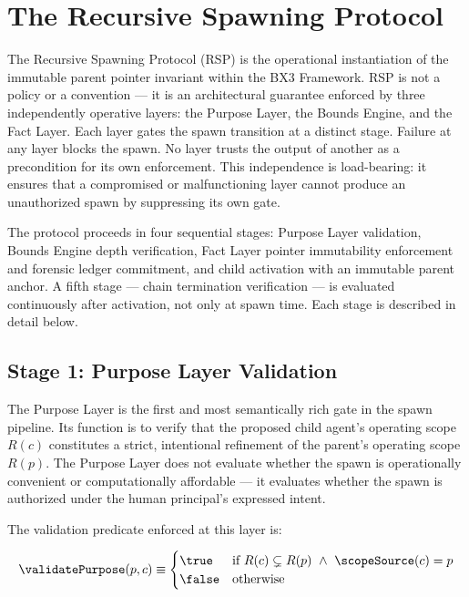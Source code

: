 \section{The Recursive Spawning Protocol}
\label{sec:rs-protocol}

The Recursive Spawning Protocol (RSP) is the operational instantiation of the immutable parent pointer invariant within the BX3 Framework. RSP is not a policy or a convention — it is an architectural guarantee enforced by three independently operative layers: the Purpose Layer, the Bounds Engine, and the Fact Layer. Each layer gates the spawn transition at a distinct stage. Failure at any layer blocks the spawn. No layer trusts the output of another as a precondition for its own enforcement. This independence is load-bearing: it ensures that a compromised or malfunctioning layer cannot produce an unauthorized spawn by suppressing its own gate.

The protocol proceeds in four sequential stages: Purpose Layer validation, Bounds Engine depth verification, Fact Layer pointer immutability enforcement and forensic ledger commitment, and child activation with an immutable parent anchor. A fifth stage — chain termination verification — is evaluated continuously after activation, not only at spawn time. Each stage is described in detail below.

\subsection{Stage 1: Purpose Layer Validation}
\label{sec:rs-protocol-purpose}

The Purpose Layer is the first and most semantically rich gate in the spawn pipeline. Its function is to verify that the proposed child agent's operating scope $R(c)$ constitutes a strict, intentional refinement of the parent's operating scope $R(p)$. The Purpose Layer does not evaluate whether the spawn is operationally convenient or computationally affordable — it evaluates whether the spawn is authorized under the human principal's expressed intent.

The validation predicate enforced at this layer is:

\begin{equation}
\validatePurpose(p, c) \equiv
\begin{cases}
\true & \text{if } R(c) \subsetneq R(p) \ \land\ \scopeSource(c) = p \\
\false & \text{otherwise}
\end{cases}
\label{eq:purpose-validation}
\end{equation}

